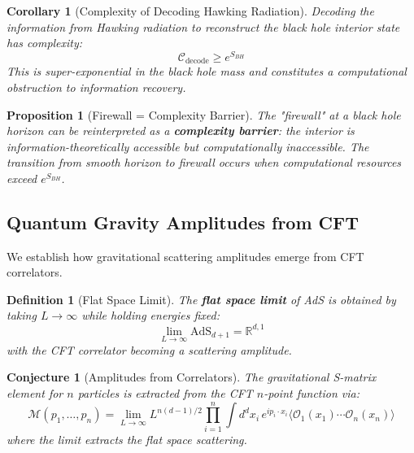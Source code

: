 \documentclass[12pt,a4paper]{article}
\newtheorem{conjecture}[theorem]{Conjecture}
\newtheorem{definition}[theorem]{Definition}
\newtheorem{proposition}[theorem]{Proposition}
\newtheorem{corollary}[theorem]{Corollary}
\begin{document}
\begin{corollary}[Complexity of Decoding Hawking Radiation]
Decoding the information from Hawking radiation to reconstruct the black hole interior state has complexity:
\begin{equation}
\mathcal{C}_{\text{decode}} \geq e^{S_{BH}}
\end{equation}
This is super-exponential in the black hole mass and constitutes a computational obstruction to information recovery.
\end{corollary}

\begin{proposition}[Firewall = Complexity Barrier]
The "firewall" at a black hole horizon can be reinterpreted as a \textbf{complexity barrier}: the interior is information-theoretically accessible but computationally inaccessible. The transition from smooth horizon to firewall occurs when computational resources exceed $e^{S_{BH}}$.
\end{proposition}

\subsection{Quantum Gravity Amplitudes from CFT}

We establish how gravitational scattering amplitudes emerge from CFT correlators.

\begin{definition}[Flat Space Limit]
The \textbf{flat space limit} of AdS is obtained by taking $L \to \infty$ while holding energies fixed:
\begin{equation}
\lim_{L \to \infty} \text{AdS}_{d+1} = \mathbb{R}^{d,1}
\end{equation}
with the CFT correlator becoming a scattering amplitude.
\end{definition}

\begin{conjecture}[Amplitudes from Correlators]
The gravitational S-matrix element for $n$ particles is extracted from the CFT $n$-point function via:
\begin{equation}
\mathcal{M}(p_1, \ldots, p_n) = \lim_{L \to \infty} L^{n(d-1)/2} \prod_{i=1}^n \int d^dx_i \, e^{ip_i \cdot x_i} \langle \mathcal{O}_1(x_1) \cdots \mathcal{O}_n(x_n) \rangle
\end{equation}
where the limit extracts the flat space scattering.
\end{conjecture}
\end{document}
